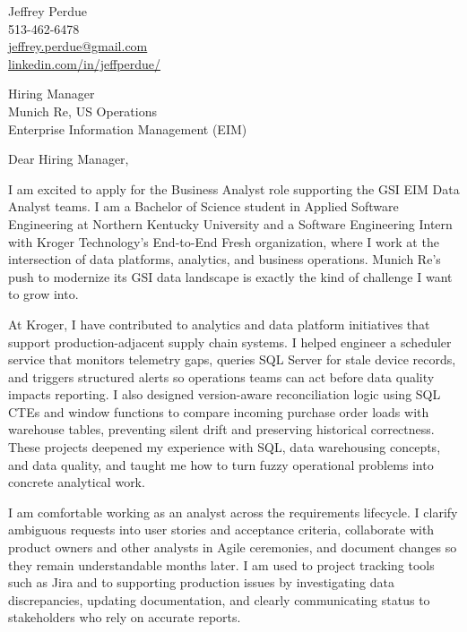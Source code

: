 \documentclass[letterpaper,11pt]{article}
\begin{document}
\begin{flushright}
Jeffrey Perdue\\
513-462-6478\\
\href{mailto:jeffrey.perdue@gmail.com}{jeffrey.perdue@gmail.com}\\
\href{https://linkedin.com/in/jeffperdue/}{linkedin.com/in/jeffperdue/}
\end{flushright}

\vspace{10pt}

Hiring Manager\\
Munich Re, US Operations\\
Enterprise Information Management (EIM)

\vspace{10pt}

Dear Hiring Manager,

I am excited to apply for the Business Analyst role supporting the GSI EIM Data Analyst teams. I am a Bachelor of Science student in Applied Software Engineering at Northern Kentucky University and a Software Engineering Intern with Kroger Technology's End-to-End Fresh organization, where I work at the intersection of data platforms, analytics, and business operations. Munich Re's push to modernize its GSI data landscape is exactly the kind of challenge I want to grow into.

At Kroger, I have contributed to analytics and data platform initiatives that support production-adjacent supply chain systems. I helped engineer a scheduler service that monitors telemetry gaps, queries SQL Server for stale device records, and triggers structured alerts so operations teams can act before data quality impacts reporting. I also designed version-aware reconciliation logic using SQL CTEs and window functions to compare incoming purchase order loads with warehouse tables, preventing silent drift and preserving historical correctness. These projects deepened my experience with SQL, data warehousing concepts, and data quality, and taught me how to turn fuzzy operational problems into concrete analytical work.

I am comfortable working as an analyst across the requirements lifecycle. I clarify ambiguous requests into user stories and acceptance criteria, collaborate with product owners and other analysts in Agile ceremonies, and document changes so they remain understandable months later. I am used to project tracking tools such as Jira and to supporting production issues by investigating data discrepancies, updating documentation, and clearly communicating status to stakeholders who rely on accurate reports.
\end{document}
